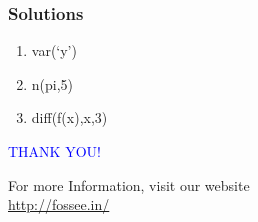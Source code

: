 \documentclass[presentation]{beamer}
\begin{document}
\begin{frame}
\frametitle{Solutions}
\label{sec-16}


\begin{enumerate}
\item var(`y')
\vspace{8pt}
\item n(pi,5)
\vspace{8pt}
\item diff(f(x),x,3)
\end{enumerate}
\end{frame}
\begin{frame}

  \begin{block}{}
  \begin{center}
  \textcolor{blue}{\Large THANK YOU!} 
  \end{center}
  \end{block}
\begin{block}{}
  \begin{center}
    For more Information, visit our website\\
    \url{http://fossee.in/}
  \end{center}  
  \end{block}
\end{frame}
\end{document}
